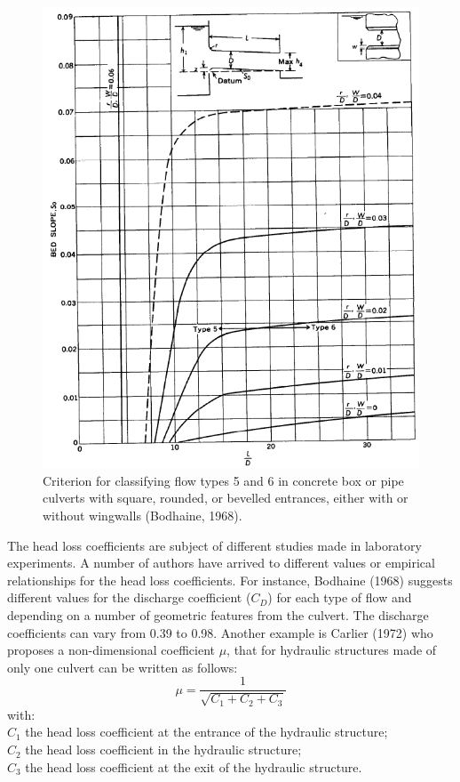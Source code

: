 \begin{figure}[H]
\begin{center}
  \includegraphics[scale=0.5]{culvert_fig4.png}
\end{center}
\caption{Criterion for classifying flow types 5 and 6 in concrete box or pipe culverts
with square, rounded, or bevelled entrances, either with or without wingwalls (Bodhaine, 1968).}
\label{fig:culvert_fig4}
\end{figure}

The head loss coefficients are subject of different studies made in laboratory experiments.
A number of authors have arrived to different values or empirical relationships for the
head loss coefficients. For instance, Bodhaine (1968) suggests different values for
the discharge coefficient ($C_D$) for each type of flow and depending on a number of
geometric features from the culvert. The discharge coefficients can vary from 0.39 to 0.98.
Another example is Carlier (1972) who proposes a non-dimensional coefficient $\mu$,
that for hydraulic structures made of only one culvert can be written as follows:
\begin{equation}
\mu = \dfrac{1}{\sqrt{C_1+C_2+C_3}}
\end{equation}
with:\\
$C_1$ the head loss coefficient at the entrance of the hydraulic structure;\\
$C_2$ the head loss coefficient in the hydraulic structure;\\
$C_3$ the head loss coefficient at the exit of the hydraulic structure.

